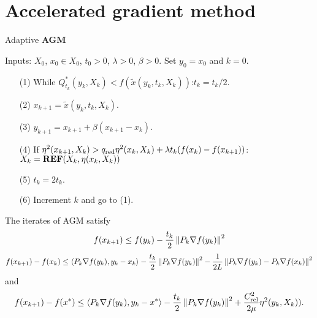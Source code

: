 
%
\section{Accelerated gradient method}\label{sec:}
%
%
\begin{yellow}
\begin{algorithm}[H]
\caption{Adaptive \textbf{AGM}} 
\label{algorithm:adaptiveGM} 
%
Inputs: $X_0$, $x_0\in X_0$, $t_0>0$, $\lambda>0$, $\beta>0$. Set $y_0=x_0$ and $k=0$.
%
\begin{itemize}
\item[(1)] While $Q^*_{t_k}(y_k, X_{k})< f(\widetilde{x}(y_k,t_k, X_{k}))$:\quad $t_k = t_k/2$.
\item[(2)] $x_{k+1} = \widetilde{x}(y_k,t_k,X_{k})$.
\item[(3)] $y_{k+1} = x_{k+1} + \beta(x_{k+1}-x_k)$.
\item[(4)] If $\eta^2(x_{k+1}, X_{k})> q_{\rm red}\eta^2(x_{k}, X_{k}) + \lambda t_{k}(f(x_{k})-f(x_{k+1}))$:\quad $X_{k}={\mbox{\textbf{REF}}}(X_{k}, \eta(x_k,X_k))$\\
\item[(5)] $t_k = 2t_k$.
\item[(6)] Increment $k$ and go to (1).
\end{itemize}
%
\end{algorithm}
\end{yellow}
%
\begin{lemma}\label{lemma:}
The iterates of AGM satisfy
%
\begin{equation}\label{eq:agm:goodestimate1}
f(x_{k+1})  \le f(y_k) -\frac{t_k}{2 }\left\|P_k \nabla f(y_k)\right\|^2 
\end{equation}
%
%
\begin{equation}\label{eq:agm:goodestimate2}
f(x_{k+1}) -f(x_k) \le \langle P_k\nabla f(y_k),y_k-x_k\rangle - \frac{t_k}{2}\left\|P_{k}\nabla f(y_k)\right\|^2- \frac{1}{2L}\left\|P_k\nabla f(y_k)-P_k\nabla f(x_k)\right\|^2
\end{equation}
%
and
%
\begin{equation}\label{eq:agm:goodestimate3}
f(x_{k+1}) -f(x^*) \le \langle P_k\nabla f(y_k),y_k-x^*\rangle- \frac{t_k}{2}\left\|P_{k}\nabla f(y_k)\right\|^2
+ \frac{C_{\rm rel}^2}{2\mu}\eta^2(y_k,X_k)).
\end{equation}
%
\end{lemma}
